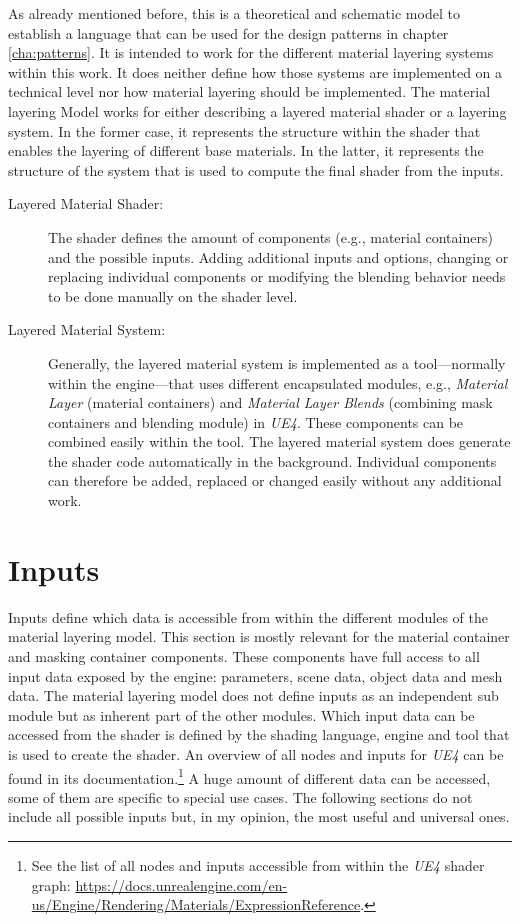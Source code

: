 As already mentioned before, this is a theoretical and schematic model to establish a language that can be used for the design patterns in chapter \ref{cha:patterns}. It is intended to work for the different  material layering systems within this work. It does neither define how those systems are implemented on a technical level nor how material layering should be implemented. The material layering Model works for either describing a layered material shader or a layering system. In the former case, it represents the structure within the shader that enables the layering of different base materials. In the latter, it represents the structure of the system that is used to compute the final shader from the inputs. 

\begin{description}
	\item[Layered Material Shader:]
		The shader defines the amount of components (e.g., material containers) and the possible inputs. Adding additional inputs and options, changing or replacing individual components or modifying the blending behavior needs to be done manually on the shader level.  
	\item[Layered Material System:]
		Generally, the layered material system is implemented as a tool---normally within the engine---that uses different encapsulated modules, e.g., \emph{Material Layer} (material containers) and \emph{Material Layer Blends} (combining mask containers and blending module) in \emph{UE4}. These components can be combined easily within the tool. The layered material system does generate the shader code automatically in the background. Individual components can therefore be added, replaced or changed easily without any additional work.  
\end{description}





\section{Inputs}\label{sec:inputs}

	Inputs define which data is accessible from within the different modules of the material layering model. This section is mostly relevant for the material container and masking container components. These components have full access to all input data exposed by the engine: parameters, scene data, object data and mesh data. The material layering model does not define inputs as an independent sub module but as inherent part of the other modules. Which input data can be accessed from the shader is defined by the shading language, engine and tool that is used to create the shader. An overview of all  nodes and inputs for \emph{UE4} can be found in its documentation.\footnote{See the list of all nodes and inputs accessible from within the \emph{UE4} shader graph: \url{https://docs.unrealengine.com/en-us/Engine/Rendering/Materials/ExpressionReference}.} A huge amount of different data can be accessed, some of them are specific to special use cases. The following sections do not include all possible inputs but, in my opinion, the most useful and universal ones.  
	

